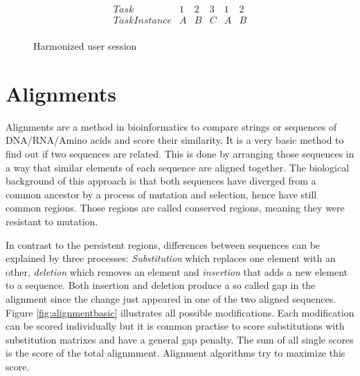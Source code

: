 \begin{figure}
\[
\begin{array}{r|ccccc}
	Task & 1 & 2 & 3 & 1 & 2\\
	\hline
	TaskInstance & A & B & C & A & B\\
\end{array} 
\]
\caption{Harmonized user session}
\label{fig:harmonized}
\end{figure}

\section{Alignments}
\label{sec:alignments}
Alignments are a method in bioinformatics to compare strings or sequences of DNA/RNA/Amino acids and score their similarity. 
It is a very basic method to find out if two sequences are related. 
This is done by arranging those sequences in a way that similar elements of each sequence are aligned together. The biological background of this approach is that
both sequences have diverged from a common ancestor by a process of mutation and selection\cite{durbin1998}, hence have still common regions. Those regions are called conserved regions, meaning they were resistant to mutation. 

In contrast to the persistent regions, differences between sequences can be explained by three processes: \textit{Substitution} which replaces one element with an other,  \textit{deletion} which removes an element and \textit{insertion} that adds a new element to a sequence.
Both insertion and deletion produce a so called gap in the alignment since the change just appeared in one of the two aligned sequences. Figure \ref{fig:alignmentbasic} illustrates all possible modifications.
Each modification can be scored individually but it is common practise to score substitutions with substitution matrixes and have a general gap penalty. The sum of all single scores is the score of the total alignmment.
Alignment algorithms try to maximize this score. 

